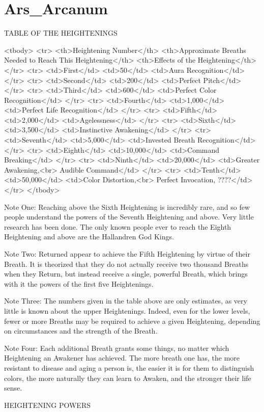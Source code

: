 \section{Ars_Arcanum}

TABLE OF THE HEIGHTENINGS


<tbody>
<tr>
<th>Heightening Number</th>
<th>Approximate Breaths Needed to Reach This Heightening</th>
<th>Effects of the Heightening</th>
</tr>
<tr>
<td>First</td>
<td>50</td>
<td>Aura Recognition</td>
</tr>
<tr>
<td>Second</td>
<td>200</td>
<td>Perfect Pitch</td>
</tr>
<tr>
<td>Third</td>
<td>600</td>
<td>Perfect Color Recognition</td>
</tr>
<tr>
<td>Fourth</td>
<td>1,000</td>
<td>Perfect Life Recognition</td>
</tr>
<tr>
<td>Fifth</td>
<td>2,000</td>
<td>Agelessness</td>
</tr>
<tr>
<td>Sixth</td>
<td>3,500</td>
<td>Instinctive Awakening</td>
</tr>
<tr>
<td>Seventh</td>
<td>5,000</td>
<td>Invested Breath Recognition</td>
</tr>
<tr>
<td>Eighth</td>
<td>10,000</td>
<td>Command Breaking</td>
</tr>
<tr>
<td>Ninth</td>
<td>20,000</td>
<td>Greater Awakening,<br>
Audible Command</td>
</tr>
<tr>
<td>Tenth</td>
<td>50,000</td>
<td>Color Distortion,<br>
Perfect Invocation, ????</td>
</tr>
</tbody>


Note One: Reaching above the Sixth Heightening is incredibly rare, and so few people understand the powers of the Seventh Heightening and above. Very little research has been done. The only known people ever to reach the Eighth Heightening and above are the Hallandren God Kings.

Note Two: Returned appear to achieve the Fifth Heightening by virtue of their Breath. It is theorized that they do not actually receive two thousand Breaths when they Return, but instead receive a single, powerful Breath, which brings with it the powers of the first five Heightenings.

Note Three: The numbers given in the table above are only estimates, as very little is known about the upper Heightenings. Indeed, even for the lower levels, fewer or more Breaths may be required to achieve a given Heightening, depending on circumstances and the strength of the Breath.

Note Four: Each additional Breath grants some things, no matter which Heightening an Awakener has achieved. The more breath one has, the more resistant to disease and aging a person is, the easier it is for them to distinguish colors, the more naturally they can learn to Awaken, and the stronger their life sense.

HEIGHTENING POWERS


